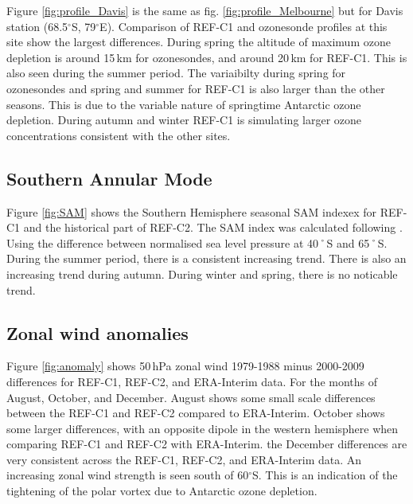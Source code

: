 Figure \ref{fig:profile_Davis} is the same as fig. \ref{fig:profile_Melbourne} but for Davis station (68.5$^\circ$S, 79$^\circ$E). Comparison of REF-C1 and ozonesonde profiles at this site show the largest differences. During spring the altitude of maximum ozone depletion is around 15\,km for ozonesondes, and around 20\,km for REF-C1. This is also seen during the summer period. The variaibilty during spring for ozonesondes and spring and summer for REF-C1 is also larger than the other seasons. This is due to the variable nature of springtime Antarctic ozone depletion. During autumn and winter REF-C1 is simulating larger ozone concentrations consistent with the other sites. 

\subsection{Southern Annular Mode}
Figure \ref{fig:SAM} shows the Southern Hemisphere seasonal SAM indexex for REF-C1 and the historical part of REF-C2.  The SAM index was calculated following \cite{DaoyiGong:2007vm}. Using the difference between normalised sea level pressure at 40˚S and 65˚S. During the summer period, there is a consistent increasing trend. There is also an increasing trend during autumn. During winter and spring, there is no noticable trend.

\subsection{Zonal wind anomalies}
Figure \ref{fig:anomaly} shows 50\,hPa zonal wind 1979-1988 minus 2000-2009 differences for REF-C1, REF-C2, and ERA-Interim data. For the months of August, October, and December. August shows some small scale differences between the REF-C1 and REF-C2 compared to ERA-Interim. October shows some larger differences, with an opposite dipole in the western hemisphere when comparing REF-C1 and REF-C2 with ERA-Interim. the December differences are very consistent across the REF-C1, REF-C2, and ERA-Interim data. An increasing zonal wind strength is seen south of 60$^\circ$S. This is an indication of the tightening of the polar vortex due to Antarctic ozone depletion.